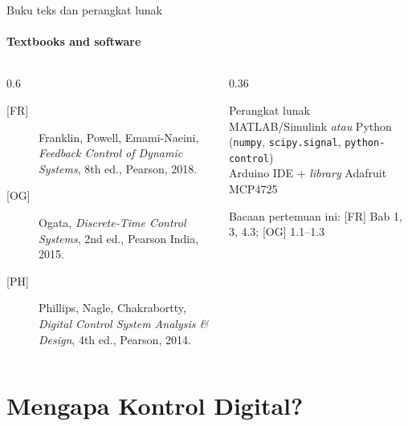 \documentclass[aspectratio=169,10pt]{beamer}
\begin{document}
\begin{frame}{Buku teks dan perangkat lunak}
	\framesubtitle{Textbooks and software}
	\begin{columns}[T]
		\begin{column}{0.6\textwidth}
			\small
			\begin{description}
				\item[{[FR]}] Franklin, Powell, Emami-Naeini, \textit{Feedback Control of Dynamic Systems}, 8th ed., Pearson, 2018.
				\item[{[OG]}] Ogata, \textit{Discrete-Time Control Systems}, 2nd ed., Pearson India, 2015.
				\item[{[PH]}] Phillips, Nagle, Chakrabortty, \textit{Digital Control System Analysis \& Design}, 4th ed., Pearson, 2014.
			\end{description}
		\end{column}
		\begin{column}{0.36\textwidth}
			\begin{block}{Perangkat lunak}
				\small
				MATLAB/Simulink \textit{atau} Python (\texttt{numpy}, \texttt{scipy.signal}, \texttt{python-control})\\[3pt]
				Arduino IDE + \textit{library} Adafruit MCP4725
			\end{block}
			\vspace{0.15cm}
			{\small Bacaan pertemuan ini: [FR] Bab 1, 3, 4.3; [OG] 1.1--1.3}
		\end{column}
	\end{columns}
\end{frame}

\section{Mengapa Kontrol Digital?\texorpdfstring{\\[4pt]{\Large{}}}{ / Why Digital Control?}}
\end{document}
